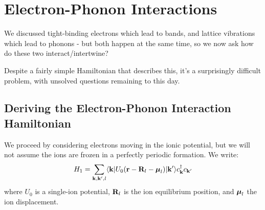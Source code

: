 \section{Electron-Phonon Interactions}
We discussed tight-binding electrons which lead to bands, and lattice vibrations which lead to phonons - but both happen at the same time, so we now ask how do these two interact/intertwine?

Despite a fairly simple Hamiltonian that describes this, it's a surprisingly difficult problem, with unsolved questions remaining to this day.

\subsection{Deriving the Electron-Phonon Interaction Hamiltonian}
We proceed by considering electrons moving in the ionic potential, but we will not assume the ions are frozen in a perfectly periodic formation. We write:
\begin{equation}
    H_1 = \sum_{\mathbf{k}, \mathbf{k}', l}\langle \mathbf{k} \rvert U_0(\mathbf{r} - \mathbf{R}_l - \mbox{\boldmath$ \mu $}_l)\lvert \mathbf{k}' \rangle c^\dagger_{\mathbf{k}}c_{\mathbf{k}'}
\end{equation}
where $U_0$ is a single-ion potential, $\mathbf{R}_l$ is the ion equilibrium position, and $\mbox{\boldmath$ \mu $}_l$ the ion displacement.

